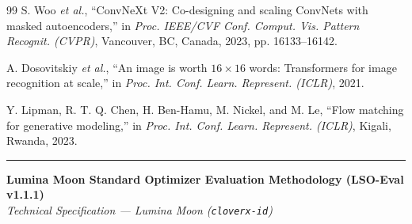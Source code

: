 \documentclass[11pt,a4paper]{article}
\renewcommand{\_}{\origunderscore\allowbreak}
\begin{document}
\begin{thebibliography}{99}
S. Woo \textit{et al.}, ``ConvNeXt V2: Co-designing and scaling ConvNets with masked autoencoders,'' in \textit{Proc. IEEE/CVF Conf. Comput. Vis. Pattern Recognit. (CVPR)}, Vancouver, BC, Canada, 2023, pp. 16133--16142.

A. Dosovitskiy \textit{et al.}, ``An image is worth $16 \times 16$ words: Transformers for image recognition at scale,'' in \textit{Proc. Int. Conf. Learn. Represent. (ICLR)}, 2021.

Y. Lipman, R. T. Q. Chen, H. Ben-Hamu, M. Nickel, and M. Le, ``Flow matching for generative modeling,'' in \textit{Proc. Int. Conf. Learn. Represent. (ICLR)}, Kigali, Rwanda, 2023.

\end{thebibliography}

\vspace{0.5cm}
\noindent\rule{\textwidth}{0.4pt}
\begin{center}
    {\small\bfseries Lumina Moon Standard Optimizer Evaluation Methodology (LSO-Eval v1.1.1)}\\[0.2em]
    {\small\itshape Technical Specification --- Lumina Moon (\texttt{cloverx-id})}
\end{center}
\end{document}
